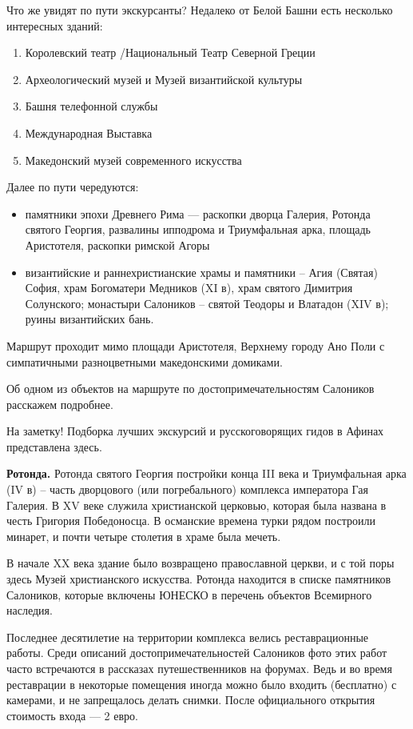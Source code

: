 Что же увидят по пути экскурсанты? Недалеко от Белой Башни есть несколько интересных зданий:
\begin{enumerate}
    \item Королевский театр /Национальный Театр Северной Греции
    \item Археологический музей и Музей византийской культуры
    \item Башня телефонной службы
    \item Международная Выставка
    \item Македонский музей современного искусства
\end{enumerate}
Далее по пути чередуются:
\begin{itemize}
    \item памятники эпохи Древнего Рима — раскопки дворца Галерия, Ротонда святого Георгия, развалины ипподрома и Триумфальная арка, площадь Аристотеля, раскопки римской Агоры
    \item византийские и раннехристианские храмы и памятники – Агия (Святая) София, храм Богоматери Медников (XI в), храм святого Димитрия Солунского; монастыри Салоников – святой Теодоры и Влатадон (XIV в); руины византийских бань.
\end{itemize}

Маршрут проходит мимо площади Аристотеля, Верхнему городу Ано Поли с симпатичными разноцветными македонскими домиками.

Об одном из объектов на маршруте по достопримечательностям Салоников расскажем подробнее.

На заметку! Подборка лучших экскурсий и русскоговорящих гидов в Афинах представлена здесь.

\textbf{Ротонда.} Ротонда святого Георгия постройки конца III века и Триумфальная арка (IV в) – часть дворцового (или погребального) комплекса императора Гая Галерия. В XV веке служила христианской церковью, которая была названа в честь Григория Победоносца. В османские времена турки рядом построили минарет, и почти четыре столетия в храме была мечеть.

В начале XX века здание было возвращено православной церкви, и с той поры здесь Музей христианского искусства. Ротонда находится в списке памятников Салоников, которые включены ЮНЕСКО в перечень объектов Всемирного наследия.

Последнее десятилетие на территории комплекса велись реставрационные работы. Среди описаний достопримечательностей Салоников фото этих работ часто встречаются в рассказах путешественников на форумах. Ведь и во время реставрации в некоторые помещения иногда можно было входить (бесплатно) с камерами, и не запрещалось делать снимки. После официального открытия стоимость входа — 2 евро.

